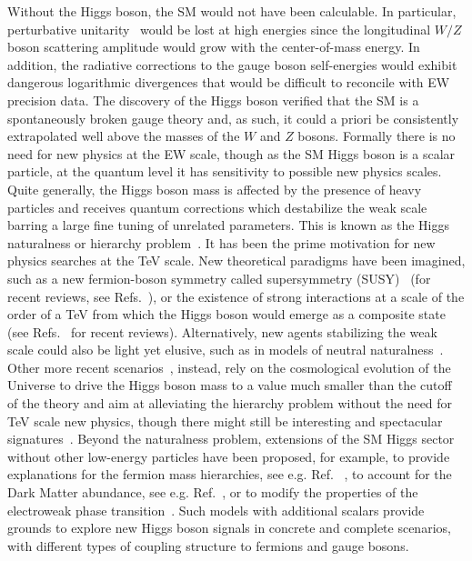 Without the Higgs boson, the SM would not have been calculable. In particular, perturbative unitarity~\cite{PhysRevLett.30.1268,PhysRevD.10.1145,LlewellynSmith:1973yud,PhysRevD.16.1519} would be lost at high energies since the longitudinal $W/Z$ boson scattering amplitude would grow with the center-of-mass energy. In addition, the radiative corrections to the gauge boson self-energies would exhibit dangerous logarithmic divergences that would be difficult to reconcile with EW precision data. The discovery of the Higgs boson verified that the SM is a spontaneously broken gauge theory and, as such, it could a priori be consistently extrapolated well above the masses of the $W$ and $Z$ bosons. Formally there is no need for new physics at the EW scale, though as the SM Higgs boson is a scalar particle, at the quantum level it has sensitivity to possible new physics scales. Quite generally, the Higgs boson mass is affected by the presence of heavy particles and receives quantum corrections which destabilize the weak scale barring a large fine tuning of unrelated parameters. This is known as the Higgs naturalness or hierarchy problem~\cite{PhysRevD.3.1818,tHooft:1980xss}. It has been the prime motivation for new physics searches at the TeV scale. New theoretical paradigms have been imagined, such as a new fermion-boson symmetry called supersymmetry (SUSY)~\cite{WESS19741} (for recent reviews, see Refs.~\cite{Martin:1997ns,Allanchach:2019wrx}), or the existence of strong interactions at a scale of the order of a TeV from which the Higgs boson would emerge as a composite state~\cite{Georgi:1986im} (see Refs.~\cite{Bellazzini:2014yua,Panico:2015jxa,Csaki:2015hcd} for recent reviews). Alternatively, new agents stabilizing the weak scale could also be light yet elusive, such as in models of neutral naturalness~\cite{Chacko:2005pe,Chacko:2005un,Craig:2015pha,Craig:2014aea}. Other more recent scenarios~\cite{Craig:2014aea,Graham:2015cka,Espinosa:2015eda}, instead, rely on the cosmological evolution of the Universe to drive the Higgs boson mass to a value much smaller than the cutoff of the theory and aim at alleviating the hierarchy problem without the need for TeV scale new physics, though there might still be interesting and spectacular signatures~\cite{Craig:2014aea,Graham:2015cka,Espinosa:2015eda,Flacke:2016szy}. Beyond the naturalness problem, extensions of the SM Higgs sector without other low-energy particles have been proposed, for example, to provide explanations for the fermion mass hierarchies, see e.g. Ref. ~\cite{Bauer:2015fxa,Bauer:2015kzy}, to account for the Dark Matter abundance, see e.g. Ref.~\cite{Barbieri:2006dq}, or to modify the properties of the electroweak phase transition~\cite{Morrissey:2012db}. Such models with additional scalars provide grounds to explore new Higgs boson signals in concrete and complete scenarios, with different types of coupling structure to fermions and gauge bosons.

